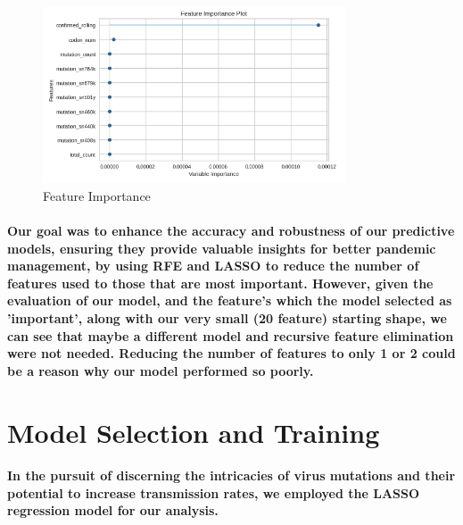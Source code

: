 \documentclass{article}
\begin{document}
\paragraph{\textbf{}}
\begin{figure}[h]
    \centering
    \includegraphics[width=0.8\textwidth]{feature_importance.png} 
    \caption{Feature Importance}
    \label{fig:my_label_5}
\end{figure}
\paragraph{\textbf{}}
\paragraph{Our goal was to enhance the accuracy and robustness of our predictive models, ensuring they provide valuable insights for better pandemic management, by using RFE and LASSO to reduce the number of features used to those that are most important. However, given the evaluation of our model, and the feature's which the model selected as 'important', along with our very small (20 feature) starting shape, we can see that maybe a different model and recursive feature elimination were not needed. Reducing the number of features to only 1 or 2 could be a reason why our model performed so poorly.}
\section{\textbf{Model Selection and Training}}
\paragraph{In the pursuit of discerning the intricacies of virus mutations and their potential to increase transmission rates, we employed the LASSO regression model for our analysis.}
\paragraph{\textbf{}}
\end{document}
